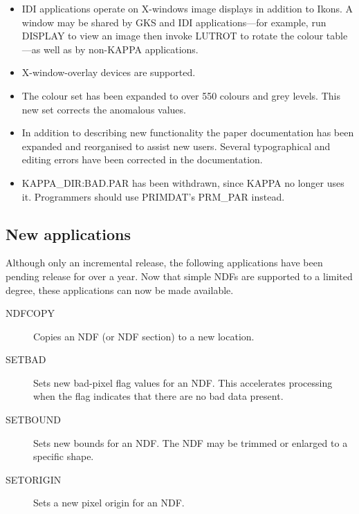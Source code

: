 {\begin{itemize}
\begin{itemize}
     \end{itemize}
     See Section~\ref{se:ndfsect} for details of NDF sections and how to
     specify them.

  \item  IDI applications operate on X-windows image displays in addition
    to Ikons. A window may be shared by GKS and IDI applications---for
    example, run DISPLAY to view an image then invoke LUTROT to rotate
    the colour table---as well as by non-KAPPA applications.  

  \item  X-window-overlay devices are supported.

  \item  The colour set has been expanded to over 550 colours and grey 
    levels.  This new set corrects the anomalous values.

  \item  In addition to describing new functionality the paper
    documentation has been expanded and reorganised to assist new users.
    Several typographical and editing errors have been corrected in
    the documentation.

  \item  KAPPA\_DIR:BAD.PAR has been withdrawn, since {\small KAPPA} no
    longer uses it.  Programmers should use PRIMDAT's PRM\_PAR instead.
\end{itemize}

\subsection{New applications}
Although only an incremental release, the following applications have
been pending release for over a year.  Now that simple NDFs are supported
to a limited degree, these applications can now be made available.
\begin{description}

  \item [NDFCOPY]  Copies an NDF (or NDF section) to a new location.

  \item [SETBAD]  Sets new bad-pixel flag values for an NDF.  This
     accelerates processing when the flag indicates that there are no
     bad data present.

  \item [SETBOUND]  Sets new bounds for an NDF.  The NDF may be trimmed
     or enlarged to a specific shape.

  \item [SETORIGIN]  Sets a new pixel origin for an NDF.


\end{description}}
